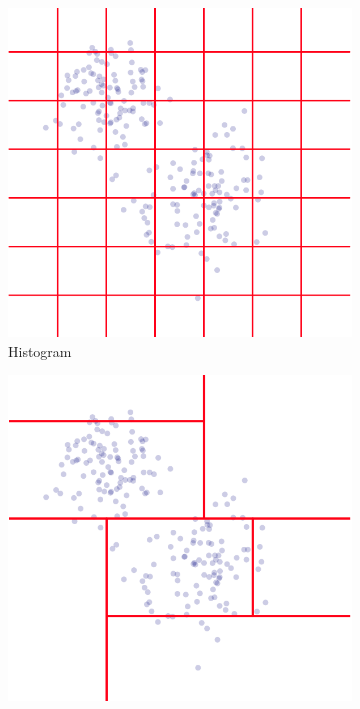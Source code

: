 \documentclass[CS5104-Notes.tex]{subfiles}
\begin{document}
\begin{figure}[H]
\centering
\begin{subfigure}{0.3\textwidth}
  \centering
  \includegraphics[width=1\textwidth, keepaspectratio]{imgs/histogram-estimation.png}
  \caption{Histogram}
\end{subfigure}
\hspace*{1cm}
\begin{subfigure}{0.3\textwidth}
  \centering
  \includegraphics[width=1\textwidth, keepaspectratio]{imgs/decision-tree-estimation.png}

\end{subfigure}
\end{figure}
\end{document}
